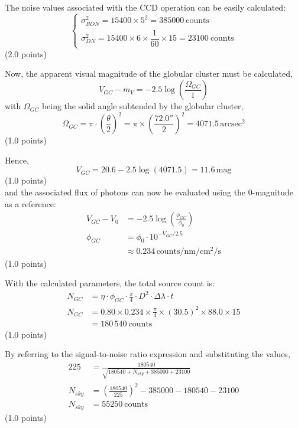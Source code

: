 \begin{description}
The noise values associated with the CCD operation can be easily calculated:
\[
\begin{cases}
\sigma_{RON}^2 = 15400 \times 5^2 = 385000~\text{counts} \\
\sigma_{DN}^2 = 15400 \times 6 \times \dfrac{1}{60} \times 15
  = 23100~\text{counts}
\end{cases}
\]
\hfill(2.0 points)

Now, the apparent visual magnitude of the globular cluster must be
calculated,
\[ V_{GC} - m_V = -2.5\log\left(\frac{\Omega_{GC}}{1}\right) \]
with $\Omega_{GC}$ being the solid angle subtended by the globular cluster,
\[ \Omega_{GC} = \pi \cdot \left(\frac{\theta}{2}\right)^2
   = \pi \times \left(\frac{72.0''}{2}\right)^2
   = 4071.5\,\mathrm{arcsec}^2 \]
\hfill(1.0 points)

Hence,
\[ V_{GC} = 20.6 - 2.5\log(4071.5) = 11.6\,\mathrm{mag} \]
\hfill(1.0 points)\\
and the associated flux of photons can now be evaluated using the
0-magnitude as a reference:
\begin{align*}
V_{GC} - V_0 &= -2.5\log\left(\frac{\phi_{GC}}{\phi_0}\right) \\
\phi_{GC} &= \phi_0 \cdot 10^{-V_{GC}/2.5} \\
  &\approx 0.234\,\mathrm{counts/nm/cm^2/s}
\end{align*}
\hfill(1.0 points)

With the calculated parameters, the total source count is:
\begin{align*}
N_{GC} &= \eta \cdot \phi_{GC} \cdot \frac{\pi}{4} \cdot D^2
  \cdot \Delta\lambda \cdot t \\
N_{GC} &= 0.80 \times 0.234 \times \frac{\pi}{4} \times (30.5)^2
  \times 88.0 \times 15 \\
  &= 180\,540~\text{counts}
\end{align*}
\hfill(1.0 points)

By referring to the signal-to-noise ratio expression and substituting the
values,
\begin{align*}
225 &= \frac{180540}{\sqrt{180540 + N_{sky} + 385000 + 23100}} \\
N_{sky} &= \left(\frac{180540}{225}\right)^2 - 385000 - 180540 - 23100 \\
N_{sky} &= 55250~\text{counts}
\end{align*}
\hfill(1.0 points)


\end{description}
